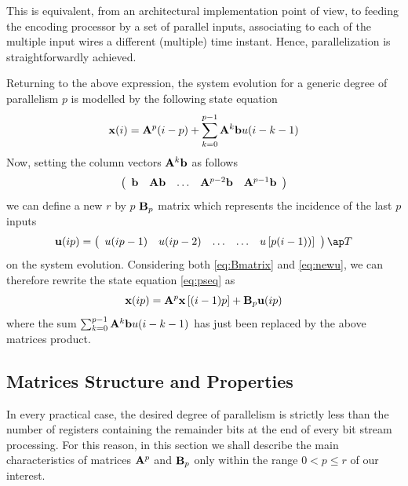 This is equivalent, from an architectural implementation point of view, to feeding the encoding processor by a set of parallel inputs, associating to each of the multiple input wires a different (multiple) time instant. Hence, parallelization is straightforwardly achieved.

Returning to the above expression, the system evolution for a generic degree of parallelism $p$ is modelled by the following state equation
\begin{equation}\label{eq:pseq}
\mathbf{x}(i) = \mathbf{A}^p(i-p) + \sum_{k=0}^{p-1}{\mathbf{A}^k \mathbf{b} u(i-k-1)}
\end{equation}
Now, setting the column vectors $\mathbf{A}^k \mathbf{b}$ as follows
\begin{equation}\label{eq:Bmatrix}
\left(
\begin{array}{ccccc}
  \mathbf{b} & \mathbf{Ab} & \ldots & \mathbf{A}^{p-2} \mathbf{b} &  \mathbf{A}^{p-1} \mathbf{b}
\end{array}
\right)
\end{equation}
we can define a new $r$ by $p$ $\mathbf{B}_p$ matrix which represents the incidence of the last $p$ inputs
\begin{equation}\label{eq:newu}
\vet u(ip) =
\left(
\begin{array}{ccccc}
  u(ip-1)   & u(ip-2) & \ldots  & \ldots & u \left[ p(i-1))\right] \\
\end{array}
\right)\ap T
\end{equation}
on the system evolution. Considering both \eqref{eq:Bmatrix} and \eqref{eq:newu}, we can therefore rewrite the state equation \eqref{eq:pseq} as
\begin{equation} \label{eq:SEmatr}
\mathbf{x} (ip) = \mathbf{A}^p \mathbf{x} \left[ (i-1)p \right] + \mathbf{B}_p \mathbf{u}(ip)
\end{equation}
where the sum $\sum_{k=0}^{p-1}{\mathbf{A}^k \mathbf{b} u(i-k-1)}$ has just been replaced by the above matrices product.

\subsection{Matrices Structure and Properties} \label{sec:Regularity}

In every practical case, the desired degree of parallelism is strictly less than the number of registers containing the remainder bits at the end of every bit stream processing. For this reason, in this section we shall describe the main characteristics of matrices $\mathbf{A}^p$ and $\mathbf{B}_p$ only within the range $0 < p \le r$ of our interest.

